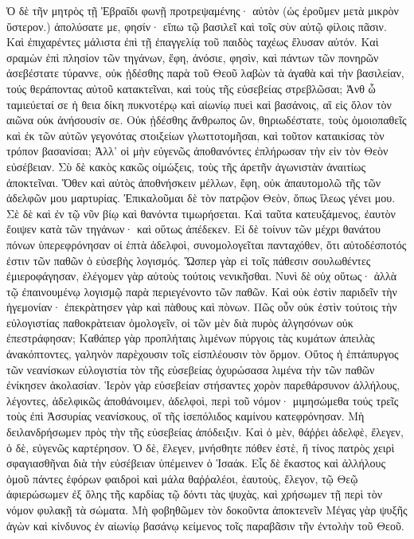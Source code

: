 Ὁ δὲ τῆν μητρὸς τῇ Ἐβραΐδι φωνῇ προτρεψαμένης· αὐτὸν (ὡς ἐροῦμεν μετὰ μικρὸν ὕστερον.) ἀπολύσατε με, φησίν· 
εἴπω τῷ βασιλεῖ καὶ τοῖς σὺν αὐτῷ φίλοις πᾶσιν. 
Καὶ ἐπιχαρέντες μάλιστα ἐπὶ τῇ ἐπαγγελίᾳ τοῦ παιδὸς ταχέως ἔλυσαν αὐτόν. 
Καὶ σραμὼν ἐπὶ πλησίον τῶν τηγάνων, ἔφη, ἀνόσιε, 
φησὶν, καὶ πάντων τῶν πονηρῶν ἀσεβέστατε τύραννε, οὐκ ᾐδέσθης παρὰ τοῦ Θεοῦ λαβὼν τὰ ἀγαθὰ καὶ τὴν βασιλείαν, τούς θεράποντας αὐτοῦ κατακτεῖναι, καὶ τοὺς τῆς εὐσεβείας στρεβλῶσαι; 
Ἀνθ ὧ ταμιεύεταί σε ἡ θεια δίκη πυκνοτέρῳ καὶ αἰωνίῳ πυεὶ καὶ βασάνοις, αἳ εἰς ὅλον τὸν αιῶνα οὐκ ἀνήσουσίν σε. 
Οὐκ ᾐδέσθης ἄνθρωπος ὢν, θηριωδέστατε, τοὺς ὁμοιοπαθεῖς καὶ ἐκ τῶν αὐτῶν γεγονότας στοιξείων γλωττοτομῆσαι, καὶ τοῦτον καταικίσας τὸν τρόπον βασανίσαι; 
Ἀλλ' οἱ μὴν εὐγενῶς ἀποθανόντες ἐπλήρωσαν τὴν εἰν τὸν Θεὸν εὐσέβειαν. 
Σὺ δὲ κακὸς κακῶς οἰμώξεις, τοὺς τῆς ἀρετῆν ἀγωνιστὰν ἀναιτίως ἀποκτεῖναι. 
Ὅθεν καὶ αὐτὸς ἀποθνήσκειν μέλλων, ἔφη, 
οὐκ ἀπαυτομολῶ τῆς τῶν ἀδελφῶν μου μαρτυρίας. 
Ἐπικαλοῦμαι δὲ τὸν πατρῷον Θεὸν, ὅπως ἵλεως γένει μου. 
Σὲ δὲ καὶ ἐν τῷ νῦν βίῳ καὶ θανόντα τιμωρήσεται. 
Καὶ ταῦτα κατευξάμενος, ἐαυτὸν ἔοιψεν κατὰ τῶν τηγάνων· καὶ οὕτως ἀπέδεκεν. 
Εἰ δὲ τοίνυν τῶν μέχρι θανάτου πόνων ὑπερεφρόνησαν οἱ ἑπτὰ ἀδελφοὶ, συνομολογεῖται πανταχόθεν, ὅτι αὐτοδέσποτός ἐστιν τῶν παθῶν ὁ εὐσεβὴς λογισμός. 
Ὤσπερ γὰρ εἰ τοῖς πάθεσιν σουλωθέντες ἐμιεροφάγησαν, ἐλέγομεν γὰρ αὐτοὺς τούτοις νενικῆσθαι. 
Νυνὶ δὲ οὐχ οὕτως· ἀλλὰ τῷ ἐπαινουμένῳ λογισμῷ παρὰ περιεγένοντο τῶν παθῶν. 
Καὶ οὐκ ἐστὶν παριδεῖν τὴν ἡγεμονίαν· ἐπεκρὰτησεν γὰρ καὶ πὰθους καὶ πὸνων. 
Πῶς οὖν οὐκ ἐστὶν τούτοις τὴν εὐλογιστίας παθοκρὰτειαν ὁμολογεῖν, οἱ τῶν μὲν διὰ πυρὸς ἀλγησόνων οὐκ ἐπεστράφησαν; 
Καθάπερ γὰρ προπλήταις λιμένων πύργοις τὰς κυμάτων ἀπειλὰς ἀνακόπτοντες, γαληνὸν παρὲχουσιν τοῖς εἰσπλέουσιν τὸν ὅρμον. 
Οὕτος ἡ ἑπτάπυργος τῶν νεανίσκων εὐλογιστία τὸν τῆς εὐσεβείας ὀχυρώσασα λιμένα τὴν τῶν παθῶν ἐνίκησεν ἀκολασίαν. 
Ἱερὸν γὰρ εὐσεβείαν στήσαντες χορὸν παρεθάρσυνον ἀλλήλους, λέγοντες, 
ἀδελφικῶς ἀποθάνοιμεν, ἀδελφοὶ, περὶ τοῦ νόμον· μιμησώμεθα τούς τρεῖς τοὺς ἐπὶ Ἀσσυρίας νεανίσκους, οἵ τῆς ἰσεπόλιδος καμίνου κατεφρόνησαν. 
Μὴ δειλανδρήσωμεν πρὸς τὴν τῆς εὐσεβείας ἀπόδειξιν. 
Καὶ ὁ μὲν, θάῤῥει ἀδελφὲ, ἔλεγεν, ὁ δὲ, εὐγενῶς καρτέρησον. 
Ὁ δὲ, ἔλεγεν, μνήσθητε πόθεν ἐστὲ, ἢ τίνος πατρὸς χειρὶ σφαγιασθῆναι διὰ τὴν εὐσέβειαν ὑπέμεινεν ὁ Ἰσαάκ. 
Εἶς δὲ ἕκαστος καὶ ἀλλήλους ὁμοῦ πάντες ἐφόρων φαιδροὶ καὶ μάλα θαῤῥαλέοι, ἐαυτοὺς, ἔλεγον, τῷ Θεῷ ἀφιερώσωμεν ἐξ ὅλης τῆς καρδίας τῷ δόντι τὰς ψυχὰς, καὶ χρήσωμεν τῇ περὶ τὸν νόμον φυλακῇ τὰ σώματα. 
Μὴ φοβηθῶμεν τὸν δοκοῦντα ἀποκτενεῖν 
Μέγας γὰρ ψυξῆς ἀγὼν καὶ κίνδυνος ἐν αἰωνίῳ βασάνῳ κείμενος τοῖς παραβᾶσιν τῆν ἐντολὴν τοῦ Θεοῦ. 

